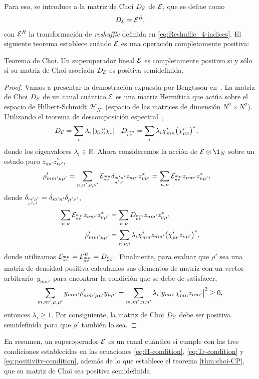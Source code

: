 Para eso, se introduce a la matriz de Choi $D_{\mathcal{E}}$ de $\mathcal{E}$,
que se define como~\cite{bengtsson_zyczkowski_2017}
\begin{align}\label{eq:ChoiMatrix-via-reshuffle}
D_{\mathcal{E}}=\mathcal{E}^{R},
\end{align}
con $\mathcal{E}^R$ la transformación de \textit{reshuffle} definida en 
\eqref{eq:Reshuffle_4-indices}. El siguiente teorema establece 
cuándo $\mathcal{E}$ es una operación completamente positiva:
\begin{thm}{Teorema de Choi.}\label{thm:choi-CP}
Un superoperador lineal $\mathcal{E}$ es completamente positivo si y sólo si 
su matriz de Choi asociada $D_{\mathcal{E}}$ es positiva semidefinida.
\end{thm}
\begin{proof}
Vamos a presentar la demostración expuesta por Bengtsson
en~\cite[p. 281]{bengtsson_zyczkowski_2017}.
La matriz de Choi $D_{\mathcal{E}}$ de un 
canal cuántico $\mathcal{E}$ es una matriz Hermítica que 
actúa sobre el espacio de Hilbert-Schmidt $\mathcal{H}_{N^2}$
(espacio de las matrices de dimensión $N^2\times N^2$). 
Utilizando el teorema de descomposición 
espectral~\cite{nielsen_chuang_2011},
\begin{align}
D_{\E}&=\sum_{i}\lambda_i\dyad{\chi_i}{\chi_i}
&
D_{\ind{mn}{\mu\nu}}&=\sum_i\lambda_i
\chi^i_{mn}\qty(\chi_{\mu\nu}^i)^*,
\end{align}
donde los eigenvalores $\lambda_i\in\mathbb{R}$. Ahora consideremos
la acción de $\E\ot \1_N$ sobre un estado puro $z_{nn'}z^*_{\nu\nu'}$,
\begin{align}
\rho'_{mm'\mu\mu'}&=
\sum_{n,n',\nu,\nu'}
\mathcal{E}_{{{}^{m\mu}_{n\nu}}}\delta_{{{}^{m'\mu'}_{n'	\nu'}}}z_{nn'}z^*_{\nu\nu'}
=
\sum_{n,\nu}
\mathcal{E}_{{{}^{m\mu}_{n\nu}}}z_{nm'}z^*_{\nu\mu'},
\end{align}
donde $\delta_{{{}^{m'\mu'}_{n'	\nu'}}}=\delta_{m'n'}\delta_{\mu'\nu'}$,
\begin{align}
\sum_{n,\nu}\mathcal{E}_{{{}^{m\mu}_{n\nu}}}z_{nm'}z^*_{\nu\mu'}&=
\sum_{n,\nu}D_{{{}^{mn}_{\mu\nu}}}z_{nm'}z^*_{\nu\mu'}\nonumber\\
\rho'_{mm'\mu\mu'}&=
\sum_{n,\nu,i}\lambda_{i}
\chi^i_{mn}z_{nm'}\qty(\chi_{\mu\nu}^iz_{\nu\mu'})^*,
\end{align}
donde utilizamos $\mathcal{E}_{{{}^{m\mu}_{n\nu}}}
=\mathcal{E}^R_{{{}^{mn}_{\mu\nu}}}
=D_{{{}^{mn}_{\mu\nu}}}$.
Finalmente, para evaluar que $\rho'$ sea una matriz de densidad positiva 
calculamos sus elementos de matriz con un vector arbitrario~$y_{mm'}$
para encontrar la condición que se debe de satisfacer,
\begin{align}
\sum_{m,m',\mu,\mu'}
y_{mm'}\rho'_{mm'\mu\mu'}y_{\mu\mu'}=
\sum_{m,m',n,n'}\lambda_i\abs{
y_{mn'}\chi^i_{mn}z_{nm'}}^2
\geq0,
\end{align}
entonces $\lambda_i\geq1$. Por consiguiente, la matriz 
de Choi $D_{\mathcal{E}}$ debe ser positiva semidefinida para que $\rho'$ 
también lo sea.
\end{proof}
En resumen, un superoperador $\mathcal{E}$ es un canal cuántico si 
cumple con las tres condiciones establecidas en las ecuaciones 
\eqref{eq:H-condition}, \eqref{eq:Tr-condition}
y \eqref{eq:positivity-condition}, además de lo que establece 
el teorema \ref{thm:choi-CP}, que su matriz de Choi sea 
positiva semidefinida.

